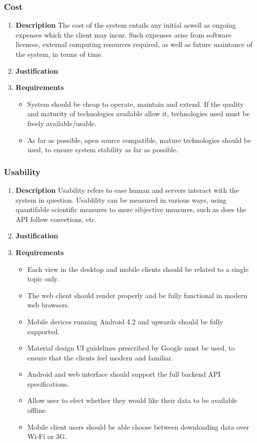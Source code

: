 \documentclass[a4paper,10pt]{article}
\begin{document}
\subsubsection{Cost}
\begin{enumerate}
\item \textbf{Description}
The cost of the system entails any initial aswell as ongoing expenses which the client may incur. Such expenses arise from software licenese, external computing resources required, as well as future maintance of the system, in terms of time.
\item \textbf{Justification}
\item \textbf{Requirements}
	\begin{itemize}
		\item System should be cheap to operate, maintain and extend. If the quality and maturity of technologies available allow it, technologies used must be freely available/usable.
		\item As far as possible, open source compatible, mature technologies should be used, to ensure system stability as far as possible.
	\end{itemize}
\end{enumerate}

\subsubsection{Usability}
\begin{enumerate}
\item \textbf{Description}
Usability refers to ease human and servers interact with the system in question. Usablility can be measured in various ways, using quantifable scientific measures to more sibjective measures, such as does the API follow convetions, etc.
\item \textbf{Justification}
\item \textbf{Requirements}
	\begin{itemize}
		\item Each view in the desktop and mobile clients should be related to a single topic only.
		\item The web client should render properly and be fully functional in modern web browsers.
		\item Mobile devices running Android 4.2 and upwards should be fully supported.
		\item Material design UI guidelines prescribed by Google must be used, to ensure that the clients feel modern and familiar. 
		\item Android and web interface should support the full backend API specifications.
		\item Allow user to elect whether they would like their data to be available offline.
		\item Mobile client users should be able choose between downloading data over Wi-Fi or 3G. 
	\end{itemize}
\end{enumerate}
\end{document}
